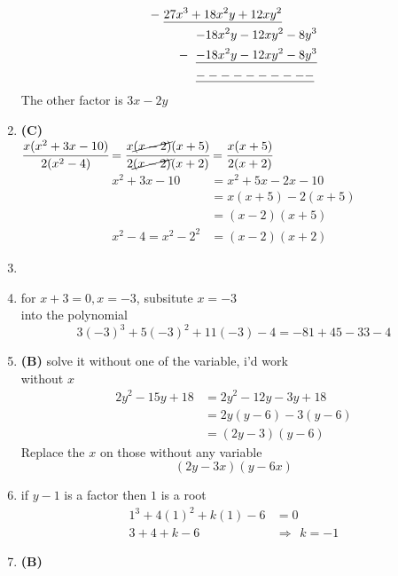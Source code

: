 \begin{multicols}{2}
\begin{enumerate}[label={\textbf{\arabic*.}}]
\begin{align*}
      -\hspace{-3pt} & \hspace{6pt} \underline{27x^3 + 18x^2y + 12xy^2} \\
      & \hspace{32pt} {-18x^2y - 12xy^2 - 8y^3} \\
     -\hspace{-26pt} & \hspace{32pt} \underline{-18x^2y - 12xy^2 -8y^3}\\
     & \hspace{32pt} \underline{----------}
    \end{align*}
    The other factor is $3x - 2y$
    \item \textbf{(C)} \\
    $\cfrac{x(x^2 + 3x - 10)}{2(x^2 - 4)} = \cfrac{x\cancel{(x-2)}(x+5)}{2\cancel{(x-2)}(x+2)} = \cfrac{x(x+5)}{2(x+2)}$ \\
    \begin{align*}
    x^2 + 3x - 10 &= x^2 + 5x - 2x - 10 \\ 
    &= x(x+5) -2(x+5) \\ 
    &= (x-2)(x+5) \\
    x^2 - 4 = x^2 - 2^2 &= (x-2)(x+2) 
    \end{align*}
    \item 
    \item for $x+3 = 0 , x = -3$, subsitute ${x=-3}$ \\
    into the polynomial \\
    $$3(-3)^3 + 5(-3)^2 + 11(-3) - 4 = -81 + 45 -33 - 4$$ 
    \item \textbf{(B)} solve it without one of the variable, i'd work \\ without $x$ 
    \begin{align*}
    2y^2 - 15y + 18 &= 2y^2 -12y - 3y + 18  \\ 
    &= 2y(y-6) -3(y-6)  \\ 
    &= (2y-3)(y-6)
    \end{align*}
    Replace the $x$ on those without any variable 
    $$(2y-3x)(y-6x)$$
\item if $y-1$ is a factor then $1$ is a root 
    \begin{align*}
    1^3 + 4(1)^2 + k(1) - 6 &= 0 \\
    3+ 4 + k - 6 \hspace{5pt} &\Rightarrow \hspace{5pt} k = -1
    \end{align*}
    \item \textbf{(B)} 

\end{enumerate}
\end{multicols}

